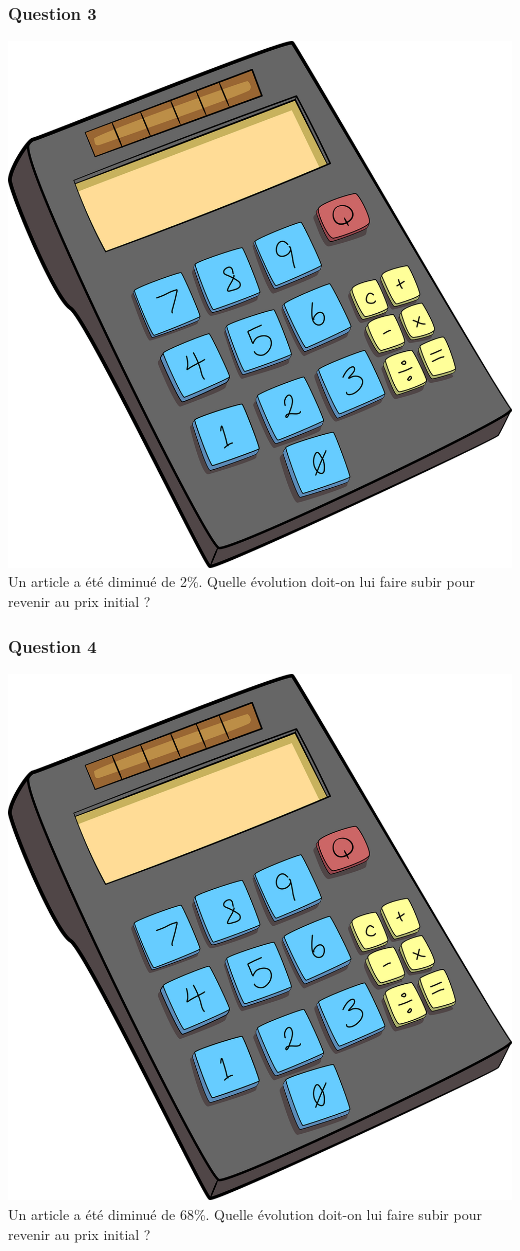 \documentclass[15pt, mathserif]{beamer}
\begin{document}
\begin{frame} 
	\frametitle{Question 3}
 \includegraphics[scale=0.01]{calculatrice} Un article a été diminué de 2\%. Quelle évolution doit-on lui faire subir pour revenir au prix initial ? \end{frame}


\begin{frame} 
	\frametitle{Question 4}
 \includegraphics[scale=0.01]{calculatrice} Un article a été diminué de 68\%. Quelle évolution doit-on lui faire subir pour revenir au prix initial ? \end{frame}
\end{document}
